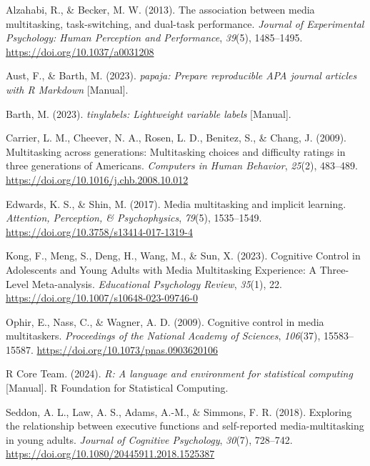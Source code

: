 \documentclass[
  man]{apa7}
\newlength{\cslhangindent}
\newenvironment{CSLReferences}[2] %
 {\begin{list}{}{%
  \setlength{\itemindent}{0pt}
  \setlength{\leftmargin}{0pt}
  \setlength{\parsep}{0pt}
  \ifodd #1
   \setlength{\leftmargin}{\cslhangindent}
   \setlength{\itemindent}{-1\cslhangindent}
  \fi
  \setlength{\itemsep}{#2\baselineskip}}}
 {\end{list}}
\begin{document}
\label{refs}
\begin{CSLReferences}{1}{0}
Alzahabi, R., \& Becker, M. W. (2013). The association between media multitasking, task-switching, and dual-task performance. \emph{Journal of Experimental Psychology: Human Perception and Performance}, \emph{39}(5), 1485--1495. \url{https://doi.org/10.1037/a0031208}

Aust, F., \& Barth, M. (2023). \emph{{papaja}: {Prepare} reproducible {APA} journal articles with {R Markdown}} {[}Manual{]}.

Barth, M. (2023). \emph{{tinylabels}: {Lightweight} variable labels} {[}Manual{]}.

Carrier, L. M., Cheever, N. A., Rosen, L. D., Benitez, S., \& Chang, J. (2009). Multitasking across generations: {Multitasking} choices and difficulty ratings in three generations of {Americans}. \emph{Computers in Human Behavior}, \emph{25}(2), 483--489. \url{https://doi.org/10.1016/j.chb.2008.10.012}

Edwards, K. S., \& Shin, M. (2017). Media multitasking and implicit learning. \emph{Attention, Perception, \& Psychophysics}, \emph{79}(5), 1535--1549. \url{https://doi.org/10.3758/s13414-017-1319-4}

Kong, F., Meng, S., Deng, H., Wang, M., \& Sun, X. (2023). Cognitive {Control} in {Adolescents} and {Young Adults} with {Media Multitasking Experience}: A {Three-Level Meta-analysis}. \emph{Educational Psychology Review}, \emph{35}(1), 22. \url{https://doi.org/10.1007/s10648-023-09746-0}

Ophir, E., Nass, C., \& Wagner, A. D. (2009). Cognitive control in media multitaskers. \emph{Proceedings of the National Academy of Sciences}, \emph{106}(37), 15583--15587. \url{https://doi.org/10.1073/pnas.0903620106}

R Core Team. (2024). \emph{R: A language and environment for statistical computing} {[}Manual{]}. R Foundation for Statistical Computing.

Seddon, A. L., Law, A. S., Adams, A.-M., \& Simmons, F. R. (2018). Exploring the relationship between executive functions and self-reported media-multitasking in young adults. \emph{Journal of Cognitive Psychology}, \emph{30}(7), 728--742. \url{https://doi.org/10.1080/20445911.2018.1525387}


\end{CSLReferences}
\end{document}
